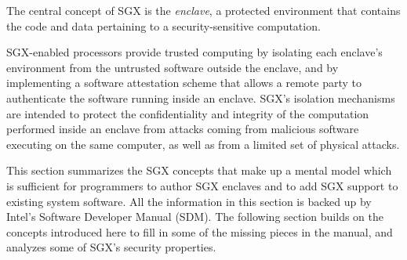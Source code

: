 \label{sec:sgx_model}

The central concept of SGX is the \textit{enclave}, a protected environment
that contains the code and data pertaining to a security-sensitive computation.

SGX-enabled processors provide trusted computing by isolating each enclave's
environment from the untrusted software outside the enclave, and by
implementing a software attestation scheme that allows a remote party to
authenticate the software running inside an enclave. SGX's isolation mechanisms
are intended to protect the confidentiality and integrity of the computation
performed inside an enclave from attacks coming from malicious software
executing on the same computer, as well as from a limited set of physical
attacks.

This section summarizes the SGX concepts that make up a mental model which is
sufficient for programmers to author SGX enclaves and to add SGX support to
existing system software. All the information in this section is backed up by
Intel's Software Developer Manual (SDM). The following section builds on the
concepts introduced here to fill in some of the missing pieces in the manual,
and analyzes some of SGX's security properties.











